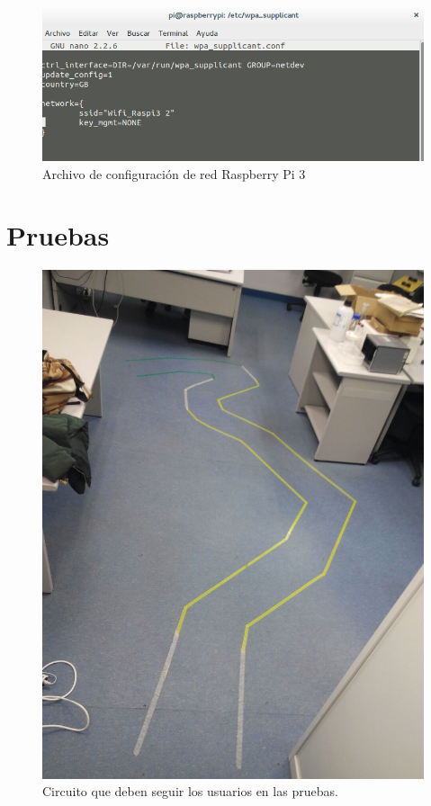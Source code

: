 \documentclass[twoside, 11pt]{epstfg}
\begin{document}
\begin{figure}[H]
	\centerline{
		\mbox{\includegraphics[width=.95\textwidth]{images/confRaspiWifi.png}}
	}
	\caption{Archivo de configuración de red Raspberry Pi 3}
	\label{confwpa}
\end{figure}

\chapter{Pruebas}

\begin{figure}[H]
	\centerline{
		\mbox{\includegraphics[width=.50\textwidth]{images/Circuito.jpg}}
	}
	\caption{Circuito que deben seguir los usuarios en las pruebas.}
	\label{Circuito}
\end{figure}
\end{document}
